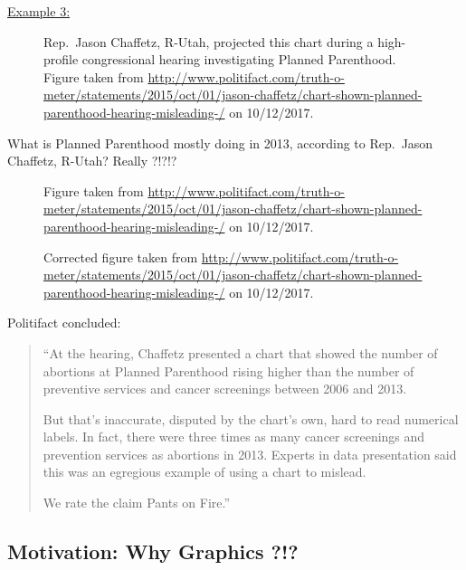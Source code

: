 \documentclass[12pt,letterpaper,final]{article}
\begin{document}
\newpage


\underline{Example 3:}


\begin{figure}[ht]
\caption{\label{PlannedParenthood1}
Rep.\ Jason Chaffetz, R-Utah, projected this chart during a high-profile congressional hearing investigating Planned Parenthood.
Figure taken from
\url{http://www.politifact.com/truth-o-meter/statements/2015/oct/01/jason-chaffetz/chart-shown-planned-parenthood-hearing-misleading-/}
on 10/12/2017.
}
\end{figure}

What is Planned Parenthood mostly doing in 2013, according to Rep.\ Jason Chaffetz, R-Utah?
Really ?!?!?

\begin{figure}[ht]
\caption{\label{PlannedParenthood1}
Figure taken from
\url{http://www.politifact.com/truth-o-meter/statements/2015/oct/01/jason-chaffetz/chart-shown-planned-parenthood-hearing-misleading-/}
on 10/12/2017. 
}
\end{figure}


\newpage


\begin{figure}[ht]
\caption{\label{PlannedParenthood1}
Corrected figure taken from
\url{http://www.politifact.com/truth-o-meter/statements/2015/oct/01/jason-chaffetz/chart-shown-planned-parenthood-hearing-misleading-/}
on 10/12/2017. 
}
\end{figure}


Politifact concluded: 
\begin{quotation}
``At the hearing, Chaffetz presented a chart that showed the number of abortions at Planned Parenthood rising higher than the number of preventive services and cancer screenings between 2006 and 2013.

But that's inaccurate, disputed by the chart's own, hard to read numerical labels. In fact, there were three times as many cancer screenings and prevention services as abortions in 2013. Experts in data presentation said this was an egregious example of using a chart to mislead.

We rate the claim Pants on Fire.''
\end{quotation}


\newpage


\subsection{Motivation: Why Graphics ?!?}
\end{document}
